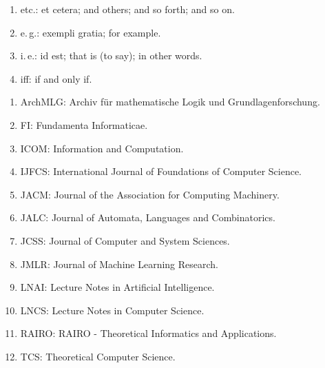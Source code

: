 

\begin{enumerate}[]
\item etc.: et cetera; and others; and so forth; and so on.
\item e.\,g.: exempli gratia; for example.
\item i.\,e.: id est; that is (to say); in other words.
\item iff: if and only if.
\end{enumerate}


\begin{enumerate}[]
\item {\sf ArchMLG}: Archiv für mathematische Logik und Grundlagenforschung.
\item {\sf FI}: Fundamenta Informaticae.
\item {\sf ICOM}: Information and Computation.
\item {\sf IJFCS}: International Journal of Foundations of Computer Science.
\item {\sf JACM}: Journal of the Association for Computing Machinery.
\item {\sf JALC}: Journal of Automata, Languages and Combinatorics.
\item {\sf JCSS}: Journal of Computer and System Sciences.
\item {\sf JMLR}: Journal of Machine Learning Research.
\item {\sf LNAI}: Lecture Notes in Artificial Intelligence.
\item {\sf LNCS}: Lecture Notes in Computer Science.
\item {\sf RAIRO}: RAIRO - Theoretical Informatics and Applications.
\item {\sf TCS}: Theoretical Computer Science.
\end{enumerate}
